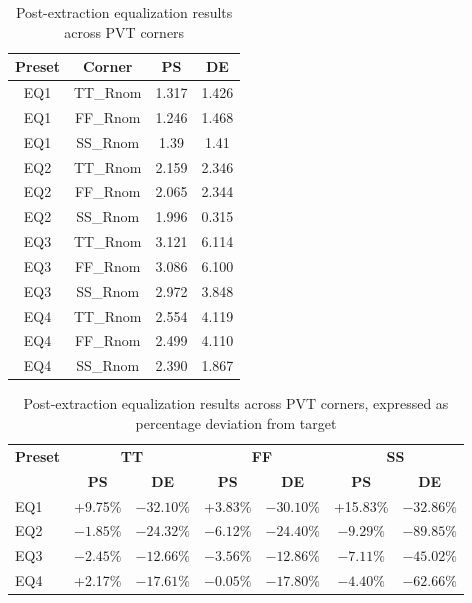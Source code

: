 \begin{table}[htbp]
	\centering
	\caption{Post-extraction equalization results across \ac{PVT} corners}
	\label{tab:PVT_eq_results_pext}
	\begin{tabular}{cccc}
	\hline \hline
	\textbf{Preset} & \textbf{Corner} & \textbf{PS} & \textbf{DE} \\
	\hline
	EQ1 & TT\_Rnom & 1.317 & 1.426 \\
	EQ1 & FF\_Rnom & 1.246 & 1.468 \\
	EQ1 & SS\_Rnom & 1.39 & 1.41 \\

	EQ2 & TT\_Rnom & 2.159 & 2.346 \\
	EQ2 & FF\_Rnom & 2.065 & 2.344 \\
	EQ2 & SS\_Rnom & 1.996 & 0.315 \\

	EQ3 & TT\_Rnom & 3.121 & 6.114 \\
	EQ3 & FF\_Rnom & 3.086 & 6.100 \\
	EQ3 & SS\_Rnom & 2.972 & 3.848 \\

	EQ4 & TT\_Rnom & 2.554 & 4.119 \\
	EQ4 & FF\_Rnom & 2.499 & 4.110 \\
	EQ4 & SS\_Rnom & 2.390 & 1.867 \\
	\hline \hline
	\end{tabular}
\end{table}

\begin{table}[htbp]
    \centering
    \caption{Post-extraction equalization results across \ac{PVT} corners,
    expressed as percentage deviation from target}
    \label{tab:PVT_eq_results_pext_deviation}
    \begin{tabular}{lcccccc}
        \hline \hline
        \textbf{Preset} &
        \multicolumn{2}{c}{\textbf{TT}} &
        \multicolumn{2}{c}{\textbf{FF}} &
        \multicolumn{2}{c}{\textbf{SS}} \\
        & \textbf{PS} & \textbf{DE}
        & \textbf{PS} & \textbf{DE}
        & \textbf{PS} & \textbf{DE} \\
        \hline
        EQ1 & +9.75\% & $-32.10\%$
            & +3.83\% & $-30.10\%$
            & +15.83\% & $-32.86\%$ \\

        EQ2 & $-1.85\%$ & $-24.32\%$
            & $-6.12\%$ & $-24.40\%$
            & $-9.29\%$ & $-89.85\%$ \\

        EQ3 & $-2.45\%$ & $-12.66\%$
            & $-3.56\%$ & $-12.86\%$
            & $-7.11\%$ & $-45.02\%$ \\

        EQ4 & +2.17\% & $-17.61\%$
            & $-0.05\%$ & $-17.80\%$
            & $-4.40\%$ & $-62.66\%$ \\
        \hline \hline
    \end{tabular}
\end{table}

